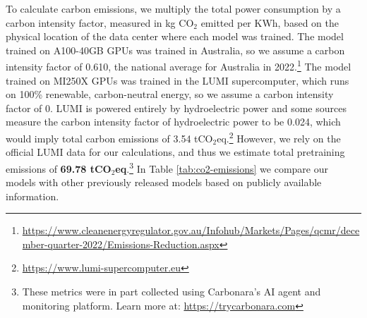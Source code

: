 To calculate carbon emissions, we multiply the total power consumption by a carbon intensity factor, measured in kg CO$_2$ emitted per KWh, based on the physical location of the data center where each model was trained. The model trained on A100-40GB GPUs was trained in Australia, so we assume a carbon intensity factor of 0.610, the national average for Australia in 2022.\footnote{\protect\url{https://www.cleanenergyregulator.gov.au/Infohub/Markets/Pages/qcmr/december-quarter-2022/Emissions-Reduction.aspx}} The model trained on MI250X GPUs was trained in the LUMI supercomputer, which runs on 100\% renewable, carbon-neutral energy, so we assume a carbon intensity factor of 0. LUMI is powered entirely by hydroelectric power and some sources \citep{Ubierna2022} measure the carbon intensity factor of hydroelectric power to be 0.024, which would imply total carbon emissions of 3.54 tCO$_2$eq.{\footnote{\url{https://www.lumi-supercomputer.eu}}} However, we rely on the official LUMI data for our calculations, and thus we estimate total pretraining emissions of \textbf{69.78 tCO$_2$eq}.\footnote{These metrics were in part collected using Carbonara's AI agent and monitoring platform. Learn more at: \url{https://trycarbonara.com}} In Table \ref{tab:co2-emissions} we compare our models with other previously released models based on publicly available information.

